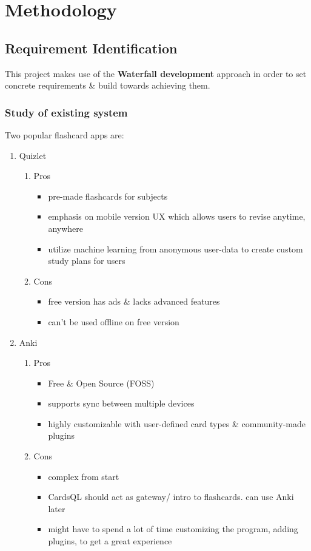 \documentclass[a4paper]{article}
\begin{document}
\section{Methodology}
\label{sec:org118f877}
\subsection{Requirement Identification}
\label{sec:org24db001}
This project makes use of the \textbf{Waterfall development} approach in order to set concrete requirements \& build towards achieving them.
\subsubsection{Study of existing system}
\label{sec:org0ed27fb}
Two popular flashcard apps are:

\begin{enumerate}
\item Quizlet
\label{sec:orgb9ee3cf}
\begin{enumerate}
\item Pros
\label{sec:orgfb3b042}
\begin{itemize}
\item pre-made flashcards for subjects
\item emphasis on mobile version UX which allows users to revise anytime, anywhere
\item utilize machine learning from anonymous user-data to create custom study plans for users
\end{itemize}
\item Cons
\label{sec:org4794d4f}
\begin{itemize}
\item free version has ads \& lacks advanced features
\item can't be used offline on free version
\end{itemize}
\end{enumerate}


\item Anki
\label{sec:org435e785}
\begin{enumerate}
\item Pros
\label{sec:org2df7776}
\begin{itemize}
\item Free \& Open Source (FOSS)
\item supports sync between multiple devices
\item highly customizable with user-defined card types \& community-made plugins
\end{itemize}
\item Cons
\label{sec:orgee0e82f}
\begin{itemize}
\item complex from start
\item CardsQL should act as gateway/ intro to flashcards. can use Anki later
\item might have to spend a lot of time customizing the program, adding plugins, to get a great experience
\end{itemize}
\end{enumerate}
\end{enumerate}
\end{document}
